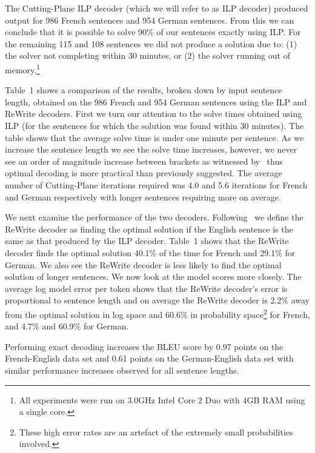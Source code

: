 The Cutting-Plane ILP decoder (which we will refer to as ILP decoder)
produced output for 986 French sentences and 954 German sentences.
From this we can conclude that it is possible to solve 90\% of our
sentences exactly using ILP.  For the remaining 115 and 108 sentences
we did not produce a solution due to: (1) the solver not completing
within 30 minutes, or (2) the solver running out of
memory.\footnote{All experiments were run on 3.0GHz Intel Core 2 Duo
  with 4GB RAM using a single core.}


Table~1 shows a comparison of the results, broken down by input
sentence length, obtained on the 986 French and 954 German sentences
using the ILP and ReWrite decoders.  First we turn our attention to
the solve times obtained using ILP (for the sentences for which the
solution was found within 30 minutes).  The table shows that the
average solve time is under one minute per sentence.  As we increase
the sentence length we see the solve time increases, however, we never
see an order of magnitude increase between brackets as witnessed
by~\cite{GermannFast04} thus optimal decoding is more practical than
previously suggested.  The average number of Cutting-Plane iterations
required was 4.0 and 5.6 iterations for French and German respectively
with longer sentences requiring more on average.

We next examine the performance of the two decoders.
Following~\cite{GermannFast04} we define the ReWrite decoder as
finding the optimal solution if the English sentence is the same as
that produced by the ILP decoder.  Table~1 shows that the ReWrite
decoder finds the optimal solution 40.1\% of the time for French and
29.1\% for German.  We also see the ReWrite decoder is less likely to
find the optimal solution of longer sentences.  We now look at the
model scores more closely. The average log model error per token shows
that the ReWrite decoder's error is proportional to sentence length
and on average the ReWrite decoder is 2.2\% away from the optimal
solution in log space and 60.6\% in probability space\footnote{These
  high error rates are an artefact of the extremely small
  probabilities involved.} for French, and 4.7\% and 60.9\% for
German.

Performing exact decoding increases the BLEU score by 0.97 points on
the French-English data set and 0.61 points on the German-English data
set with similar performance increases observed for all sentence
lengths.

